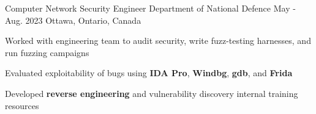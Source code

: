 

\begin{cventries}

  \cventry
    {Computer Network Security Engineer} %
    {Department of National Defence} %
    {May - Aug. 2023} %
    {Ottawa, Ontario, Canada} %
    {
      \begin{cvitems} %
        \item{Worked with engineering team to audit security, write fuzz-testing harnesses, and run fuzzing campaigns}
        \item{Evaluated exploitability of bugs using \textbf{IDA Pro}, \textbf{Windbg}, \textbf{gdb}, and \textbf{Frida}}
        \item{Developed \textbf{reverse engineering} and vulnerability discovery internal training resources}
      \end{cvitems}
    }


\end{cventries}
